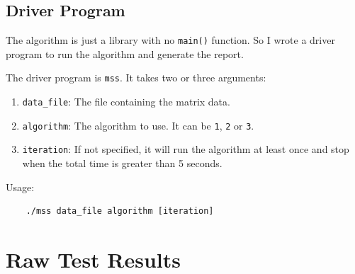 \documentclass[a4paper,oneside]{book}
\begin{document}
\section{Driver Program}
\label{app:driver}

The algorithm is just a library with no \verb|main()| function.
So I wrote a driver program to run the algorithm and generate the report.

The driver program is \verb|mss|. It takes two or three arguments:

\begin{enumerate}
\item \verb|data_file|: The file containing the matrix data.
\item \verb|algorithm|: The algorithm to use. It can be \verb|1|, \verb|2| or \verb|3|.
\item \verb|iteration|: If not specified, it will run the algorithm at least once and stop
when the total time is greater than 5 seconds.
\end{enumerate}

Usage:

\begin{verbatim}
    ./mss data_file algorithm [iteration]
\end{verbatim}

\chapter{Raw Test Results}\label{app:raw}
\end{document}
